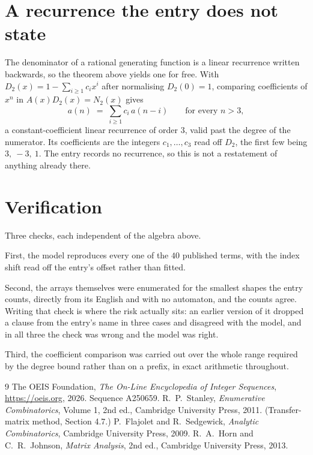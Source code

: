 \documentclass[11pt,a4paper]{article}
\theoremstyle{plain}
\theoremstyle{definition}
\begin{document}
\section{A recurrence the entry does not state}

The denominator of a rational generating function is a linear recurrence written backwards, so
the theorem above yields one for free. With $D_2(x)=1-\sum_{i\ge1}c_ix^i$ after normalising
$D_2(0)=1$, comparing coefficients of $x^n$ in $A(x)D_2(x)=N_2(x)$ gives
\[
a(n)\;=\;\sum_{i\ge1}c_i\,a(n-i)\qquad\text{for every }n>3,
\]
a constant-coefficient linear recurrence of order $3$, valid past the degree of the
numerator. Its coefficients are the integers $c_1,\dots,c_{3}$ read off $D_2$, the first few being $3,\ -3,\ 1$. The entry records no recurrence, so this is not a restatement of anything
already there.

\section{Verification}

Three checks, each independent of the algebra above.

First, the model reproduces every one of the $40$ published terms, with the index shift
read off the entry's offset rather than fitted.

Second, the arrays themselves were enumerated for the smallest shapes the entry counts,
directly from its English and with no automaton, and the counts agree. Writing that check is
where the risk actually sits: an earlier version of it dropped a clause from the entry's name
in three cases and disagreed with the model, and in all three the check was wrong and the model
was right.

Third, the coefficient comparison was carried out over the whole range required by the degree
bound rather than on a prefix, in exact arithmetic throughout.

\begin{thebibliography}{9}
 The OEIS Foundation, \emph{The On-Line Encyclopedia of Integer
Sequences}, \url{https://oeis.org}, 2026. Sequence A250659.
 R.~P.~Stanley, \emph{Enumerative Combinatorics}, Volume 1, 2nd ed.,
Cambridge University Press, 2011. (Transfer-matrix method, Section 4.7.)
 P.~Flajolet and R.~Sedgewick, \emph{Analytic Combinatorics}, Cambridge
University Press, 2009.
 R.~A.~Horn and C.~R.~Johnson, \emph{Matrix Analysis}, 2nd ed., Cambridge
University Press, 2013.
\end{thebibliography}
\end{document}
